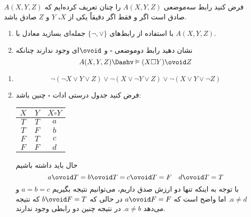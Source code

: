 فرض کنید رابط سه‌موضعی $A(X,Y,Z)$ را چنان تعریف کرده‌ایم که $A(X,Y,Z)$ صادق است اگر و فقط اگر دقیقاً یکی از $X$، $Y$ و $Z$ صادق باشد.

\begin{enumerate}
\item
با استفاده از رابط‌های
$\{\neg,\vee\}$
جمله‌ای بسازید معادل با
$A(X,Y,Z)$.
\item
نشان دهید رابط دوموضعی $\square$ و $\ovoid$ای وجود ندارند چنانکه
$$
A(X,Y,Z)\Dashv\vDash(X\square Y)\ovoid Z
$$
\end{enumerate}\quad
\begin{ans}
\begin{enumerate}
\item
$$
\neg(\neg X\vee Y\vee Z)\vee\neg(X\vee\neg Y\vee Z)\vee\neg(X\vee Y\vee\neg Z)
$$
\item
فرض کنید جدول درستی ادات
$\square$
چنین باشد:

\begin{tabular}{c|c|c}
$X$ & $Y$ & $X\square Y$ \\
\hline
$T$ & $T$ & $a$ \\
$T$ & $F$ & $b$ \\
$F$ & $T$ & $c$ \\
$F$ & $F$ & $d$ \\
\end{tabular}

حال باید داشته باشیم
$$
a\ovoid T = b\ovoid T = c\ovoid T = F \quad d\ovoid T = T
$$
با توجه به اینکه تنها دو ارزش صدق داریم، می‌توانیم نتیجه بگیریم
$a=b=c$
و
$a\neq d$.
اما واضح است که
$a\ovoid F=F$
در حالی که
$b\ovoid F=T$
که نتیجه می‌دهد
$a\neq b$.
در نتیجه چنین دو رابطی وجود ندارند.

\end{enumerate}
\end{ans}